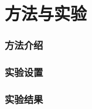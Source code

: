 \section{方法与实验}

\begin{frame}
  \frametitle{方法介绍}
\end{frame}

\begin{frame}
  \frametitle{实验设置}
\end{frame}

\begin{frame}
  \frametitle{实验结果}
\end{frame}
